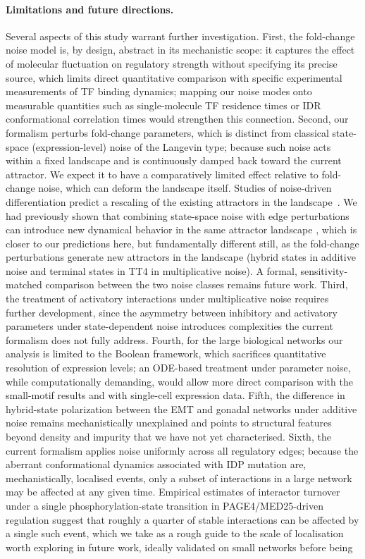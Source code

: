 \documentclass[11pt]{article}
\begin{document}
\paragraph{Limitations and future directions.}
Several aspects of this study warrant further investigation. First, the fold-change noise model is, by design, abstract in its mechanistic scope: it captures the effect of molecular fluctuation on regulatory strength without specifying its precise source, which limits direct quantitative comparison with specific experimental measurements of TF binding dynamics; mapping our noise modes onto measurable quantities such as single-molecule TF residence times or IDR conformational correlation times would strengthen this connection. Second, our formalism perturbs fold-change parameters, which is distinct from classical state-space (expression-level) noise of the Langevin type; because such noise acts within a fixed landscape and is continuously damped back toward the current attractor. We expect it to have a comparatively limited effect relative to fold-change noise, which can deform the landscape itself. Studies of noise-driven differentiation predict a rescaling of the existing attractors in the landscape~\cite{Herrera2024ADifferentiation, Mojtahedi2016CellTransition}. We had previously shown that combining state-space noise with edge perturbations can introduce new dynamical behavior in the same attractor landscape \cite{Hari2025APlasticity}, which is closer to our predictions here, but fundamentally different still, as the fold-change perturbations generate new attractors in the landscape (hybrid states in additive noise and terminal states in TT4 in multiplicative noise). A formal, sensitivity-matched comparison between the two noise classes remains future work. Third, the treatment of activatory interactions under multiplicative noise requires further development, since the asymmetry between inhibitory and activatory parameters under state-dependent noise introduces complexities the current formalism does not fully address. Fourth, for the large biological networks our analysis is limited to the Boolean framework, which sacrifices quantitative resolution of expression levels; an ODE-based treatment under parameter noise, while computationally demanding, would allow more direct comparison with the small-motif results and with single-cell expression data. Fifth, the difference in hybrid-state polarization between the EMT and gonadal networks under additive noise remains mechanistically unexplained and points to structural features beyond density and impurity that we have not yet characterised. Sixth, the current formalism applies noise uniformly across all regulatory edges; because the aberrant conformational dynamics associated with IDP mutation are, mechanistically, localised events, only a subset of interactions in a large network may be affected at any given time. Empirical estimates of interactor turnover under a single phosphorylation-state transition in PAGE4/MED25-driven regulation suggest that roughly a quarter of stable interactions can be affected by a single such event, which we take as a rough guide to the scale of localisation worth exploring in future work, ideally validated on small networks before being 
\end{document}

